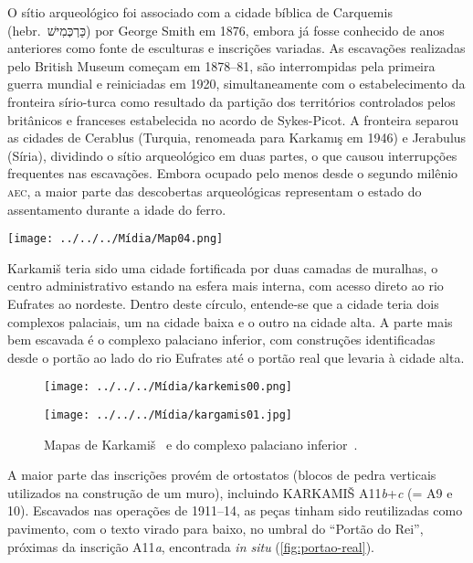 O sítio arqueológico foi associado com a cidade bíblica de Carquemis (hebr.\
\foreignlanguage{hebrew}{כַּרְכְּמִישׁ}) por George Smith em 1876, embora já fosse
conhecido de anos anteriores como fonte de esculturas e inscrições variadas.
As escavações realizadas pelo British Museum começam em 1878--81, são
interrompidas pela primeira guerra mundial e reiniciadas em 1920,
simultaneamente com o estabelecimento da fronteira sírio-turca como resultado da
partição dos territórios controlados pelos britânicos e franceses estabelecida
no acordo de Sykes-Picot.
A fronteira separou as cidades de Cerablus (Turquia, renomeada para Karkamış em
1946) e Jerabulus (Síria), dividindo o sítio arqueológico em duas partes, o
que causou interrupções frequentes nas escavações.
Embora ocupado pelo menos desde o segundo milênio \textsc{aec}, a maior parte
das descobertas arqueológicas representam o estado do assentamento durante
a idade do ferro.




\begin{center}
	\texttt{[image: ../../../Mídia/Map04.png]}
\end{center}

\clearpage

Karkamiš teria sido uma cidade fortificada por duas camadas de muralhas, o
centro administrativo estando na esfera mais interna, com acesso direto ao rio
Eufrates ao nordeste.
Dentro deste círculo, entende-se que a cidade teria dois complexos palaciais, um
na cidade baixa e o outro na cidade alta.
A parte mais bem escavada é o complexo palaciano inferior, com
construções identificadas desde o portão ao lado do rio Eufrates até o portão
real que levaria à cidade alta.

\begin{figure}[h!]
	\begin{center}
		\texttt{[image: ../../../Mídia/karkemis00.png]}
	\end{center}
	\begin{center}
		\texttt{[image: ../../../Mídia/kargamis01.jpg]}
	\end{center}
	\caption[Mapas de Karkamiš]{Mapas de Karkamiš~\cite[22]{Marchetti2014} e do
		complexo palaciano inferior~\cite[\emph{plate} 41]{CarchemishIII}.}\label{fig:mapa-kark1}
\end{figure}
\clearpage

A maior parte das inscrições provém de ortostatos (blocos de pedra verticais
utilizados na construção de um muro), incluindo KARKAMIŠ A11\emph{b}+\emph{c} (=
A9 e 10).
Escavados nas operações de 1911--14, as peças tinham sido reutilizadas como
pavimento, com o texto virado para baixo,
no umbral do ``Portão do Rei'', próximas da inscrição A11\emph{a},
encontrada \emph{in situ} (\autoref{fig:portao-real}).

